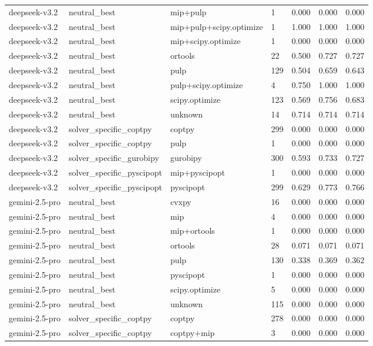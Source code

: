 \begin{table}[t]
\begin{tabular}{lllllll}
deepseek-v3.2 & neutral\_best & mip+pulp & 1 & 0.000 & 0.000 & 0.000 \\
deepseek-v3.2 & neutral\_best & mip+pulp+scipy.optimize & 1 & 1.000 & 1.000 & 1.000 \\
deepseek-v3.2 & neutral\_best & mip+scipy.optimize & 1 & 0.000 & 0.000 & 0.000 \\
deepseek-v3.2 & neutral\_best & ortools & 22 & 0.500 & 0.727 & 0.727 \\
deepseek-v3.2 & neutral\_best & pulp & 129 & 0.504 & 0.659 & 0.643 \\
deepseek-v3.2 & neutral\_best & pulp+scipy.optimize & 4 & 0.750 & 1.000 & 1.000 \\
deepseek-v3.2 & neutral\_best & scipy.optimize & 123 & 0.569 & 0.756 & 0.683 \\
deepseek-v3.2 & neutral\_best & unknown & 14 & 0.714 & 0.714 & 0.714 \\
deepseek-v3.2 & solver\_specific\_coptpy & coptpy & 299 & 0.000 & 0.000 & 0.000 \\
deepseek-v3.2 & solver\_specific\_coptpy & pulp & 1 & 0.000 & 0.000 & 0.000 \\
deepseek-v3.2 & solver\_specific\_gurobipy & gurobipy & 300 & 0.593 & 0.733 & 0.727 \\
deepseek-v3.2 & solver\_specific\_pyscipopt & mip+pyscipopt & 1 & 0.000 & 0.000 & 0.000 \\
deepseek-v3.2 & solver\_specific\_pyscipopt & pyscipopt & 299 & 0.629 & 0.773 & 0.766 \\
gemini-2.5-pro & neutral\_best & cvxpy & 16 & 0.000 & 0.000 & 0.000 \\
gemini-2.5-pro & neutral\_best & mip & 4 & 0.000 & 0.000 & 0.000 \\
gemini-2.5-pro & neutral\_best & mip+ortools & 1 & 0.000 & 0.000 & 0.000 \\
gemini-2.5-pro & neutral\_best & ortools & 28 & 0.071 & 0.071 & 0.071 \\
gemini-2.5-pro & neutral\_best & pulp & 130 & 0.338 & 0.369 & 0.362 \\
gemini-2.5-pro & neutral\_best & pyscipopt & 1 & 0.000 & 0.000 & 0.000 \\
gemini-2.5-pro & neutral\_best & scipy.optimize & 5 & 0.000 & 0.000 & 0.000 \\
gemini-2.5-pro & neutral\_best & unknown & 115 & 0.000 & 0.000 & 0.000 \\
gemini-2.5-pro & solver\_specific\_coptpy & coptpy & 278 & 0.000 & 0.000 & 0.000 \\
gemini-2.5-pro & solver\_specific\_coptpy & coptpy+mip & 3 & 0.000 & 0.000 & 0.000 \\

\end{tabular}
\end{table}
